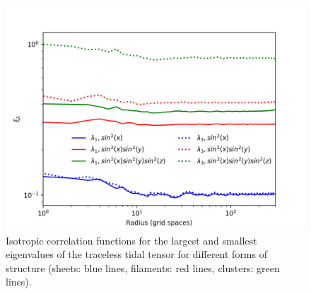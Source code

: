 \documentclass[a4paper,11pt]{article}
\begin{document}
\begin{figure}[!htb]
\centering
\includegraphics[trim={0 0 0 0},scale=0.8]{sheet_filament_cluster.png}
\caption{Isotropic correlation functions for the largest and smallest eigenvalues of the traceless tidal tensor for different forms of structure (sheets: blue lines, filaments: red lines, clusters: green lines).}\label{fig:iso_comp}
\end{figure}













 
\end{document}

